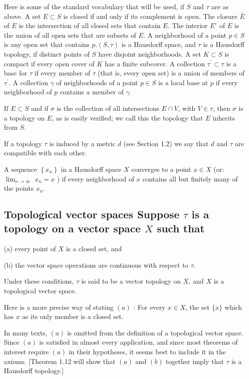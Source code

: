 \documentclass[10pt]{article}
\begin{document}
Here is some of the standard vocabulary that will be used, if $S$ and $\tau$ are as above. A set $E \subset S$ is closed if and only if its complement is open. The closure $\bar{E}$ of $E$ is the intersection of all closed sets that contain $E$. The interior $E^{\circ}$ of $E$ is the union
of all open sets that are subsets of $E$. A neighborhood of a point $p \in S$ is any open set that contains $p .(S, \tau)$ is a Hausdorff space, and $\tau$ is a Hausdorff topology, if distinct points of $S$ have disjoint neighborhoods. A set $K \subset S$ is compact if every open cover of $K$ has a finite subcover. A collection $\tau^{\prime} \subset \tau$ is a base for $\tau$ if every member of $\tau$ (that is, every open set) is a union of members of $\tau^{\prime}$. A collection $\gamma$ of neighborhoods of a point $p \in S$ is a local base at $p$ if every neighborhood of $p$ contains a member of $\gamma$.

If $E \subset S$ and if $\sigma$ is the collection of all intersections $E \cap V$, with $V \in \tau$, then $\sigma$ is a topology on $E$, as is easily verified; we call this the topology that $E$ inherits from $S$.

If a topology $\tau$ is induced by a metric $d$ (see Section 1.2) we say that $d$ and $\tau$ are compatible with each other.

A sequence $\left\{x_{n}\right\}$ in a Hausdorff space $X$ converges to a point $x \in X$ (or: $\lim _{n \rightarrow \infty}$ $x_{n}=x$ ) if every neighborhood of $x$ contains all but finitely many of the points $x_{n}$.

\subsection{Topological vector spaces Suppose $\tau$ is a topology on a vector space $X$ such that}
(a) every point of $X$ is a closed set, and

(b) the vector space operations are continuous with respect to $\tau$.

Under these conditions, $\tau$ is said to be a vector topology on $X$, and $X$ is a topological vector space.

Here is a more precise way of stating $(a)$ : For every $x \in X$, the set $\{x\}$ which has $x$ as its only member is a closed set.

In many texts, $(a)$ is omitted from the definition of a topological vector space. Since $(a)$ is satisfied in almost every application, and since most theorems of interest require $(a)$ in their hypotheses, it seems best to include it in the axioms. [Theorem 1.12 will show that $(a)$ and $(b)$ together imply that $\tau$ is a Hausdorff topology.]
\end{document}
